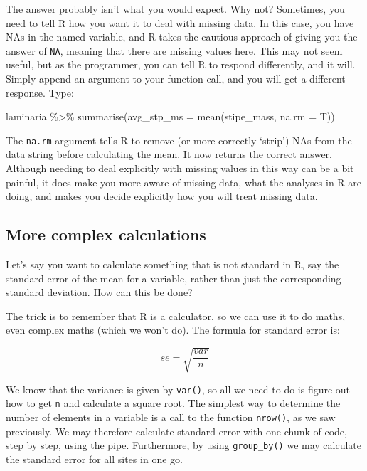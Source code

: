 \documentclass[
]{book}
\newenvironment{Shaded}{\begin{snugshade}}{\end{snugshade}}
\newcommand{\AttributeTok}[1]{\textcolor[rgb]{0.77,0.63,0.00}{#1}}
\newcommand{\FunctionTok}[1]{\textcolor[rgb]{0.00,0.00,0.00}{#1}}
\newcommand{\NormalTok}[1]{#1}
\newcommand{\SpecialCharTok}[1]{\textcolor[rgb]{0.00,0.00,0.00}{#1}}
\begin{document}
The answer probably isn't what you would expect. Why not? Sometimes, you need to tell R how you want it to deal with missing data. In this case, you have NAs in the named variable, and R takes the cautious approach of giving you the answer of \texttt{NA}, meaning that there are missing values here. This may not seem useful, but as the programmer, you can tell R to respond differently, and it will. Simply append an argument to your function call, and you will get a different response. Type:

\begin{Shaded}
\begin{Highlighting}[]
\NormalTok{laminaria }\SpecialCharTok{\%\textgreater{}\%} 
  \FunctionTok{summarise}\NormalTok{(}\AttributeTok{avg\_stp\_ms =} \FunctionTok{mean}\NormalTok{(stipe\_mass, }\AttributeTok{na.rm =}\NormalTok{ T))}
\end{Highlighting}
\end{Shaded}

The \texttt{na.rm} argument tells R to remove (or more correctly `strip') NAs from the data string before calculating the mean. It now returns the correct answer. Although needing to deal explicitly with missing values in this way can be a bit painful, it does make you more aware of missing data, what the analyses in R are doing, and makes you decide explicitly how you will treat missing data.

\hypertarget{more-complex-calculations}{%
\subsection{More complex calculations}\label{more-complex-calculations}}

Let's say you want to calculate something that is not standard in R, say the standard error of the mean for a variable, rather than just the corresponding standard deviation. How can this be done?

The trick is to remember that R is a calculator, so we can use it to do maths, even complex maths (which we won't do). The formula for standard error is:

\[se = \sqrt{\frac{var}{n}}\]

We know that the variance is given by \texttt{var()}, so all we need to do is figure out how to get \texttt{n} and calculate a square root. The simplest way to determine the number of elements in a variable is a call to the function \texttt{nrow()}, as we saw previously. We may therefore calculate standard error with one chunk of code, step by step, using the pipe. Furthermore, by using \texttt{group\_by()} we may calculate the standard error for all sites in one go.
\end{document}
